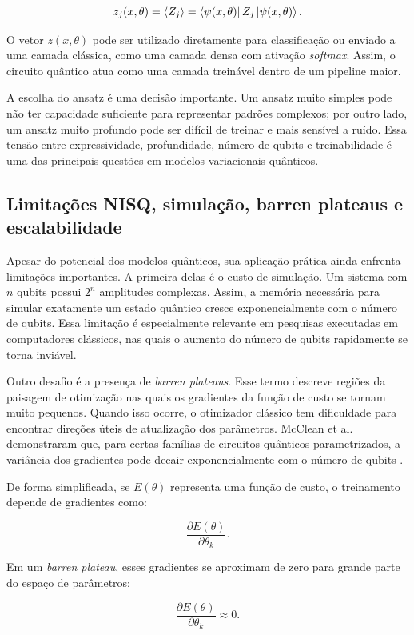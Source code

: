 \documentclass[
    12pt,
    openright,
    oneside,
    a4paper,
    english,
    brazil
]{abntex2}
\begin{document}
\[
z_j(x,\theta)
=
\langle Z_j \rangle
=
\bra{\psi(x,\theta)}
Z_j
\ket{\psi(x,\theta)}.
\]

O vetor \(z(x,\theta)\) pode ser utilizado diretamente para classificação ou enviado a uma camada clássica, como uma camada densa com ativação \textit{softmax}. Assim, o circuito quântico atua como uma camada treinável dentro de um pipeline maior.

A escolha do ansatz é uma decisão importante. Um ansatz muito simples pode não ter capacidade suficiente para representar padrões complexos; por outro lado, um ansatz muito profundo pode ser difícil de treinar e mais sensível a ruído. Essa tensão entre expressividade, profundidade, número de qubits e treinabilidade é uma das principais questões em modelos variacionais quânticos.

\subsection{Limitações NISQ, simulação, barren plateaus e escalabilidade}

Apesar do potencial dos modelos quânticos, sua aplicação prática ainda enfrenta limitações importantes. A primeira delas é o custo de simulação. Um sistema com \(n\) qubits possui \(2^n\) amplitudes complexas. Assim, a memória necessária para simular exatamente um estado quântico cresce exponencialmente com o número de qubits. Essa limitação é especialmente relevante em pesquisas executadas em computadores clássicos, nas quais o aumento do número de qubits rapidamente se torna inviável.

Outro desafio é a presença de \textit{barren plateaus}. Esse termo descreve regiões da paisagem de otimização nas quais os gradientes da função de custo se tornam muito pequenos. Quando isso ocorre, o otimizador clássico tem dificuldade para encontrar direções úteis de atualização dos parâmetros. McClean et al. demonstraram que, para certas famílias de circuitos quânticos parametrizados, a variância dos gradientes pode decair exponencialmente com o número de qubits \cite{mcclean2018barren}.

De forma simplificada, se \(E(\theta)\) representa uma função de custo, o treinamento depende de gradientes como:

\[
\frac{\partial E(\theta)}{\partial \theta_k}.
\]

Em um \textit{barren plateau}, esses gradientes se aproximam de zero para grande parte do espaço de parâmetros:

\[
\frac{\partial E(\theta)}{\partial \theta_k}
\approx 0.
\]
\end{document}
